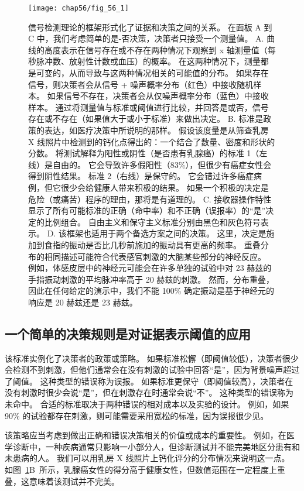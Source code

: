 \begin{figure}[htbp]
	\centering
	\texttt{[image: chap56/fig\_56\_1]}
	\caption{信号检测理论的框架形式化了证据和决策之间的关系。
		在面板 A 到 C 中，我们考虑简单的是-否决策，决策者只接受一个测量值。
		A. 曲线的高度表示在信号存在或不存在两种情况下观察到 x 轴测量值（每秒脉冲数、放射性计数或血压）的概率。
		在这两种情况下，测量都是可变的，从而导致与这两种情况相关的可能值的分布。
		如果存在信号，则决策者会从信号 + 噪声概率分布（红色）中接收随机样本。
		如果信号不存在，决策者会从仅噪声概率分布（蓝色）中接收样本。
		通过将测量值与标准或阈值进行比较，并回答是或否，信号存在或不存在（如果值大于或小于标准）来做出决定。
		B. 标准是政策的表达，如医疗决策中所说明的那样。
		假设该度量是从筛查乳房 X 线照片中检测到的钙化点得出的：一个结合了数量、密度和形状的分数。
		将测试解释为阳性或阴性（是否患有乳腺癌）的标准 1（左线）是自由的。
		它会导致许多假阳性（83\%），但很少有癌症女性会得到阴性结果。
		标准 2（右线）是保守的。
		它会错过许多癌症病例，但它很少会给健康人带来积极的结果。
		如果一个积极的决定是危险（或痛苦）程序的理由，那将是有道理的。
		C. 接收器操作特性显示了所有可能标准的正确（命中率）和不正确（误报率）的“是”决定的比例组合。
		自由主义和保守主义标准分别由黑色和灰色符号表示。
		D. 该框架也适用于两个备选方案之间的决策。
		这里，决定是施加到食指的振动是否比几秒前施加的振动具有更高的频率。
		重叠分布的相同描述可能符合代表感官刺激的大脑某些部分的神经反应。
		例如，体感皮层中的神经元可能会在许多单独的试验中对 23 赫兹的手指振动刺激的平均脉冲率高于 20 赫兹的刺激。
		然而，分布重叠，因此在任何给定的演示中，我们不能 100\% 确定振动是基于神经元的响应是 20 赫兹还是 23 赫兹。}
	\label{fig:56_1}
\end{figure}


\subsection{一个简单的决策规则是对证据表示阈值的应用}

该标准实例化了决策者的政策或策略。
如果标准松懈（即阈值较低），决策者很少会检测不到刺激，但他们通常会在没有刺激的试验中回答“是”，因为背景噪声超过了阈值。
这种类型的错误称为误报。
如果标准更保守（即阈值较高），决策者在没有刺激时很少会说“是”，但在刺激存在时通常会说“不”。
这种类型的错误称为未命中。
合适的标准取决于两种错误的相对成本以及实验的设计。
例如，如果 90\% 的试验都存在刺激，则可能需要采用宽松的标准，因为误报很少见。


该策略应当考虑到做出正确和错误决策相关的价值或成本的重要性。
例如，在医学诊断中，一种疾病通常只影响一小部分人，但诊断测试并不能完美地区分患有和未患病的人。
我们可以用乳房 X 线照片上钙化评分的分布情况来说明这一点。
如图~\ref{fig:56_1}B~所示，乳腺癌女性的得分高于健康女性，但数值范围在一定程度上重叠，这意味着该测试并不完美。


